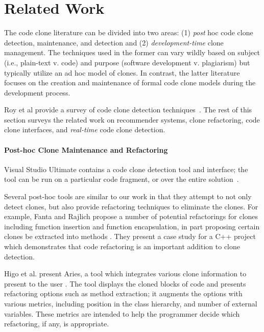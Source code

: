 \documentclass[preprint,10pt]{sigplanconf}
\begin{document}
\section{Related Work}
\label{sec:related}

The code clone literature can be divided into two areas: (1)
\emph{post} hoc code clone detection, maintenance, and detection and
(2) \emph{development-time} clone management. The techniques used in the
former can vary wildly based on subject (i.e., plain-text v. code) and
purpose (software development v. plagiarism) but typically utilize an
ad hoc model of clones. In contrast, the latter literature focuses on
the creation and maintenance of formal code clone models during the
development process.

Roy et al provide a survey of code clone detection
techniques~\cite{Roy2009}. The rest of this section surveys the
related work on recommender systems, clone refactoring,
 code clone interfaces, and \emph{real-time} code clone detection.

\paragraph{Post-hoc Clone Maintenance and Refactoring}

Visual Studio Ultimate contains a code clone detection tool and
interface; the tool can be run on a particular code fragment, or over
the entire solution~\cite{VSClones}. 

Several post-hoc tools are similar to our work in that they attempt to not only
detect clones, but also provide refactoring techniques to eliminate the clones.
For example, Fanta and Rajlich propose a number of
potential refactorings for clones including function insertion and function encapsulation,
in part proposing certain clones be extracted into methods \cite{Fanta1999}.  They 
present a case study for a C++ project which demonstrates that code refactoring is an important 
addition to clone detection.

Higo et al. present Aries, a tool which integrates various clone
information to present to the user \cite{Higo2008}.  The tool displays the
cloned blocks of code and presents refactoring options such as method
extraction; it augments the options with various metrics, including position in
the class hierarchy, and number of external variables. These metrics
are intended to help the programmer decide which refactoring, if any,
is appropriate.
\end{document}
